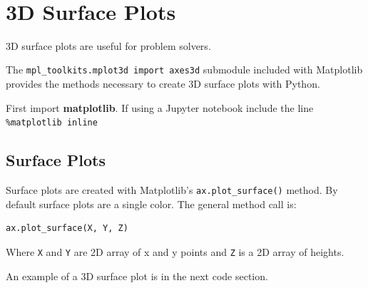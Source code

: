 \documentclass{book}
\begin{document}
    \begin{center}
    \end{center}
    { \hspace*{\fill} \\}
    

    
        \section{3D Surface Plots}\label{d-surface-plots}
    




    
        3D surface plots are useful for problem solvers.

The \lstinline!mpl_toolkits.mplot3d import axes3d! submodule included
with Matplotlib provides the methods necessary to create 3D surface
plots with Python.
    




    
        First import \textbf{matplotlib}. If using a Jupyter notebook include
the line \lstinline!%matplotlib inline!
    




    
        \subsection{Surface Plots}\label{surface-plots}

Surface plots are created with Matplotlib's
\lstinline!ax.plot_surface()! method. By default surface plots are a
single color. The general method call is:

\begin{lstlisting}
ax.plot_surface(X, Y, Z)
\end{lstlisting}

Where \lstinline!X! and \lstinline!Y! are 2D array of x and y points and
\lstinline!Z! is a 2D array of heights.

An example of a 3D surface plot is in the next code section.
    
\end{document}
